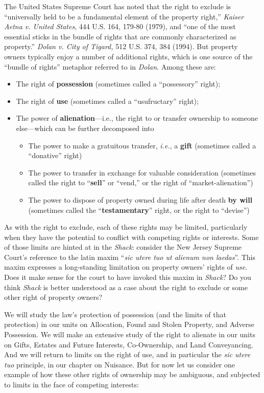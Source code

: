 
The United States Supreme Court has noted that the right to exclude is
``universally held to be a fundamental element of the property right,''
\textit{Kaiser Aetna v. United States}, 444 U.S. 164, 179-80 (1979), and ``one
of the most essential sticks in the bundle of rights that are commonly
characterized as property.'' \textit{Dolan v. City of Tigard,} 512 U.S. 374,
384 (1994). But property owners typically enjoy a number of additional rights,
which is one source of the ``bundle of rights'' metaphor referred to in
\textit{Dolan}. Among these are:

\begin{itemize}
\item The right of \textbf{possession} (sometimes called a ``possessory''
right); 
\item The right of \textbf{use} (sometimes called a ``usufructary'' right); 
\item The power of \textbf{alienation}---i.e., the right to or transfer
ownership to someone else---which can be further decomposed into

\begin{itemize}
\item The power to make a gratuitous transfer, \textit{i.e.}, a \textbf{gift}
(sometimes called a ``donative'' right)
\item The power to transfer in exchange for valuable consideration (sometimes
called the right to ``\textbf{sell}'' or ``vend,'' or the right of
``market-alienation'')
\item The power to dispose of property owned during life after death \textbf{by
will} (sometimes called the ``\textbf{testamentary}'' right, or the right to
``devise'')
\end{itemize}
\end{itemize}

As with the right to exclude, each of these rights may be limited, particularly
when they have the potential to conflict with competing rights or interests.
Some of those limits are hinted at in the \textit{Shack}: consider the New
Jersey Supreme Court's reference to the latin maxim ``\textit{sic utere tuo ut
alienum non laedas}''. This maxim expresses a long-standing limitation on
property owners' rights of \textit{use}. Does it make sense for the court to
have invoked this maxim in \textit{Shack}? Do you think \textit{Shack} is
better understood as a case about the right to exclude or some other right of
property owners? 

We will study the law's protection of possession (and the limits of that
protection) in our units on Allocation, Found and Stolen Property, and Adverse
Possession. We will make an extensive study of the right to alienate in our
units on Gifts, Estates and Future Interests, Co-Ownership, and Land
Conveyancing. And we will return to limits on the right of use, and in
particular the \textit{sic utere tuo} principle, in our chapter on Nuisance.
But for now let us consider one example of how these other rights of ownership
may be ambiguous, and subjected to limits in the face of competing interests:

